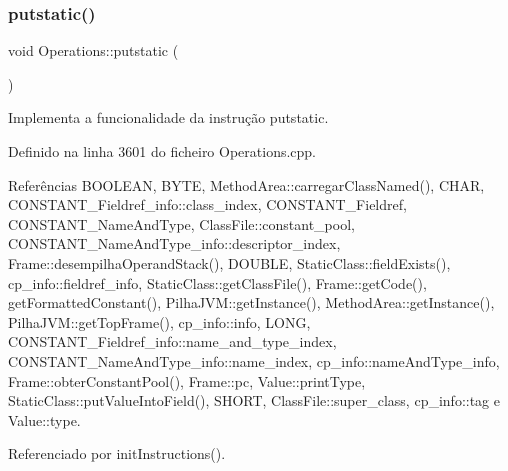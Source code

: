 \subsubsection{\texorpdfstring{putstatic()}{putstatic()}}
{\footnotesize\ttfamily void Operations\+::putstatic (\begin{DoxyParamCaption}{ }\end{DoxyParamCaption})\hspace{0.3cm}{\ttfamily [private]}}



Implementa a funcionalidade da instrução putstatic. 



Definido na linha 3601 do ficheiro Operations.\+cpp.



Referências B\+O\+O\+L\+E\+AN, B\+Y\+TE, Method\+Area\+::carregar\+Class\+Named(), C\+H\+AR, C\+O\+N\+S\+T\+A\+N\+T\+\_\+\+Fieldref\+\_\+info\+::class\+\_\+index, C\+O\+N\+S\+T\+A\+N\+T\+\_\+\+Fieldref, C\+O\+N\+S\+T\+A\+N\+T\+\_\+\+Name\+And\+Type, Class\+File\+::constant\+\_\+pool, C\+O\+N\+S\+T\+A\+N\+T\+\_\+\+Name\+And\+Type\+\_\+info\+::descriptor\+\_\+index, Frame\+::desempilha\+Operand\+Stack(), D\+O\+U\+B\+LE, Static\+Class\+::field\+Exists(), cp\+\_\+info\+::fieldref\+\_\+info, Static\+Class\+::get\+Class\+File(), Frame\+::get\+Code(), get\+Formatted\+Constant(), Pilha\+J\+V\+M\+::get\+Instance(), Method\+Area\+::get\+Instance(), Pilha\+J\+V\+M\+::get\+Top\+Frame(), cp\+\_\+info\+::info, L\+O\+NG, C\+O\+N\+S\+T\+A\+N\+T\+\_\+\+Fieldref\+\_\+info\+::name\+\_\+and\+\_\+type\+\_\+index, C\+O\+N\+S\+T\+A\+N\+T\+\_\+\+Name\+And\+Type\+\_\+info\+::name\+\_\+index, cp\+\_\+info\+::name\+And\+Type\+\_\+info, Frame\+::obter\+Constant\+Pool(), Frame\+::pc, Value\+::print\+Type, Static\+Class\+::put\+Value\+Into\+Field(), S\+H\+O\+RT, Class\+File\+::super\+\_\+class, cp\+\_\+info\+::tag e Value\+::type.



Referenciado por init\+Instructions().

